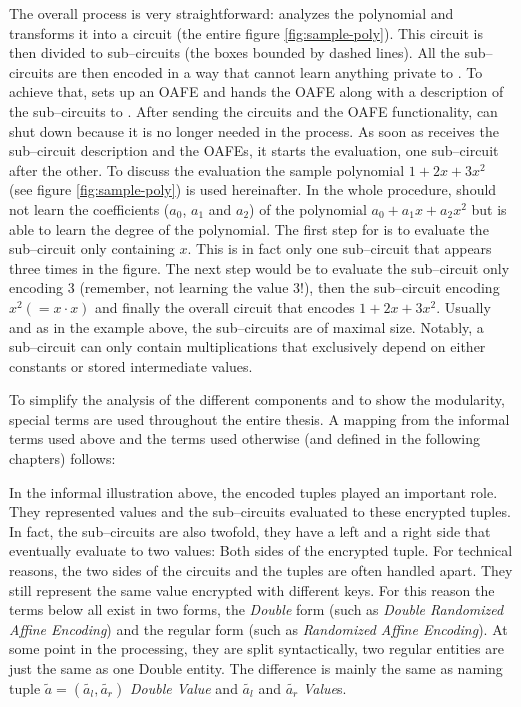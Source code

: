 The overall process is very straightforward: \JWpOne{} analyzes the polynomial
and transforms it into a circuit (the entire figure \ref{fig:sample-poly}). This
circuit is then divided to sub--circuits (the boxes bounded by dashed lines).
All the sub--circuits are then encoded in a way that \JWpTwo{} cannot learn
anything private to \JWpOne{}. To achieve that, \JWpOne{} sets up an OAFE and
hands the OAFE along with a description of the sub--circuits to \JWpTwo{}.
After sending the circuits and the OAFE functionality, \JWpOne{} can shut down
because it is no longer needed in the process. As soon as \JWpTwo{} receives the
sub--circuit description and the OAFEs, it starts the evaluation, one
sub--circuit after the other. To discuss the evaluation the sample polynomial $1
+ 2x + 3x^2$ (see figure \ref{fig:sample-poly}) is used hereinafter. In the
whole procedure, \JWpTwo{} should not learn the coefficients ($a_0$, $a_1$ and
$a_2$) of the polynomial $a_0 + a_1x + a_2x^2$ but is able to learn the degree
of the polynomial. The first step for \JWpTwo{} is to evaluate the sub--circuit
only containing $x$.  This is in fact only one sub--circuit that appears three
times in the figure.  The next step would be to evaluate the sub--circuit only
encoding $3$ (remember, not learning the value $3$!), then the sub--circuit
encoding $x^2 (= x \cdot x)$ and finally the overall circuit that encodes $1 +
2x + 3x^2$.  Usually and as in the example above, the sub--circuits are of
maximal size. Notably, a sub--circuit can only contain multiplications
that exclusively depend on either constants or stored intermediate values.

To simplify the analysis of the different components and to show the modularity,
special terms are used throughout the entire thesis. A mapping from the informal
terms used above and the terms used otherwise (and defined in the following
chapters) follows:

In the informal illustration above, the encoded tuples played an important role.
They represented values and the sub--circuits evaluated to these encrypted
tuples. In fact, the sub--circuits are also twofold, they have a left and a
right side that eventually evaluate to two values: Both sides of the encrypted
tuple. For technical reasons, the two sides of the circuits and the tuples are
often handled apart. They still represent the same value encrypted with
different keys. For this reason the terms below all exist in two forms, the
\emph{Double} form (such as \emph{Double Randomized Affine Encoding}) and the
regular form (such as \emph{Randomized Affine Encoding}). At some point in the
processing, they are split syntactically, two regular entities are just the same
as one Double entity. The difference is mainly the same as naming tuple
$\widetilde{a} = (\widetilde{a_l}, \widetilde{a_r})$ \emph{Double Value} and
$\widetilde{a_l}$ and $\widetilde{a_r}$ \emph{Value}s.

